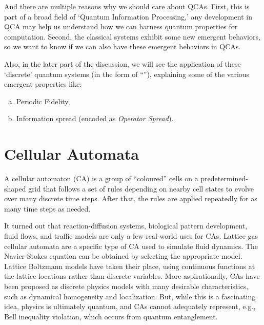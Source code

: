\documentclass[11pt, oneside, listof=totoc]{scrbook}
\begin{document}
And there are multiple reasons why we should care about QCAs. First, this is part of a broad field of `Quantum Information Processing,' any development in QCA may help us understand how we can harness quantum properties for computation. Second, the classical systems exhibit some new emergent behaviors, so we want to know if we can also have these emergent behaviors in QCAs.


Also, in the later part of the discussion, we will see the application of these `discrete' quantum systems (in the form of ``''\cite{Fisher2023}), explaining some of the various emergent properties like:
\begin{enumerate}[(a), noitemsep]
    \item Periodic Fidelity,
    \item Information spread (encoded as \emph{Operator Spread}).
\end{enumerate}

\section{Cellular Automata}

A cellular automaton (CA) is a group of ``coloured'' cells on a predetermined-shaped grid that follows a set of rules depending on nearby cell states to evolve over many discrete time steps. After that, the rules are applied repeatedly for as many time steps as needed.

It turned out that reaction-diffusion systems, biological pattern development, fluid flows, and traffic models are only a few real-world uses for CAs. Lattice gas cellular automata are a specific type of CA used to simulate fluid dynamics. The Navier-Stokes equation can be obtained by selecting the appropriate model. Lattice Boltzmann models have taken their place, using continuous functions at the lattice locations rather than discrete variables. More aspirationally, CAs have been proposed as discrete physics models with many desirable characteristics, such as dynamical homogeneity and localization. But, while this is a fascinating idea, physics is ultimately quantum, and CAs cannot adequately represent, e.g., Bell inequality violation, which occurs from quantum entanglement.
\end{document}
